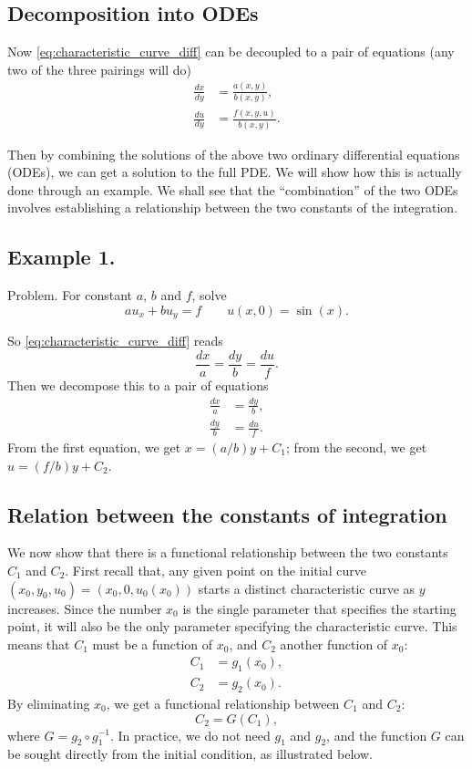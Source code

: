 \documentclass{article}
\begin{document}
\subsection{Decomposition into ODEs}

Now \eqref{eq:characteristic_curve_diff}
can be decoupled to a pair of equations
(any two of the three pairings will do)
$$
\begin{aligned}
\frac{dx}{dy} &= \frac{ a(x, y) } { b(x, y) }, \\
\frac{du}{dy} &= \frac{ f(x, y, u) } { b(x, y) }.
\end{aligned}
$$

Then by combining the solutions of the above two
ordinary differential equations (ODEs),
we can get a solution to the full PDE.
%
We will show how this is actually done through an example.
%
We shall see that the ``combination'' of the two ODEs involves establishing
a relationship between the two constants of the integration.




\subsection{Example 1.}

Problem.
For constant $a$, $b$ and $f$, solve
$$
a u_x + b u_y = f
\qquad
u(x, 0) = \sin(x).
$$

So \eqref{eq:characteristic_curve_diff} reads
$$
\frac{ dx } { a } =
\frac{ dy } { b } =
\frac{ du } { f }.
$$
Then we decompose this to a pair of equations
$$
\begin{aligned}
\frac{ dx } { a } &= \frac{ dy } { b }, \\
\frac{ dy } { b } &= \frac{ du } { f }.
\end{aligned}
$$
From the first equation, we get
$x = (a/b) y + C_1$;
from the second, we get
$u = (f/b) y + C_2$.


\subsection{Relation between the constants of integration}


We now show that there is a functional relationship
between the two constants $C_1$ and $C_2$.
%
First recall that,
any given point on the initial curve
$(x_0, y_0, u_0) = (x_0, 0, u_0(x_0))$
starts a distinct characteristic curve
as $y$ increases.
%
Since the number $x_0$ is the single parameter
that specifies the starting point,
it will also be the only parameter
specifying the characteristic curve.
%
This means that $C_1$ must be a function
of $x_0$, and $C_2$ another function of $x_0$:
$$
\begin{aligned}
C_1 &= g_1(x_0), \\
C_2 &= g_2(x_0).
\end{aligned}
$$
By eliminating $x_0$,
we get a functional relationship between $C_1$ and $C_2$:
%
\begin{equation}
C_2 = G(C_1),
\label{eq:C1C2_relationship}
\end{equation}
where $G = g_2 \circ g_1^{-1}$.
%
In practice, we do not need $g_1$ and $g_2$,
and the function $G$ can be sought
directly from the initial condition,
as illustrated below.
\end{document}
